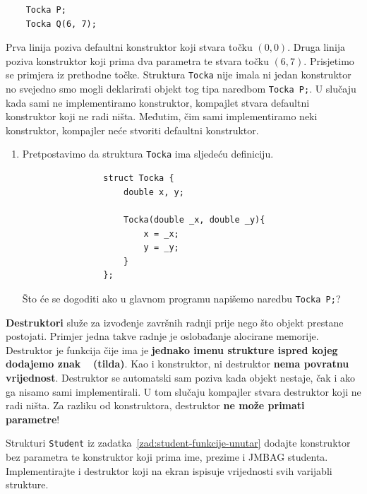 \begin{verbatim}
    Tocka P;
    Tocka Q(6, 7);
\end{verbatim}

Prva linija poziva defaultni konstruktor koji stvara točku $(0,0)$. Druga linija poziva konstruktor koji prima dva parametra te stvara točku $(6, 7)$.
Prisjetimo se primjera iz prethodne točke. Struktura \texttt{Tocka} nije imala ni jedan konstruktor no svejedno smo mogli deklarirati objekt tog tipa naredbom \texttt{Tocka P;}. U slučaju kada sami ne implementiramo konstruktor, kompajlet stvara defaultni konstruktor koji ne radi ništa. 
Međutim, čim sami implementiramo neki konstruktor, kompajler neće stvoriti defaultni konstruktor.

\begin{razmisljanje}
    \begin{enumerate}
        \item Pretpostavimo da struktura \texttt{Tocka} ima sljedeću definiciju.
            \begin{verbatim}
                struct Tocka {
                    double x, y;

                    Tocka(double _x, double _y){
                        x = _x;
                        y = _y;
                    }
                };
            \end{verbatim}
            Što će se dogoditi ako u glavnom programu napišemo naredbu \texttt{Tocka P;}?
    \end{enumerate}
\end{razmisljanje}


\medskip

\textbf{Destruktori} služe za izvođenje završnih radnji prije nego što objekt prestane postojati. Primjer jedna takve radnje je oslobađanje alocirane memorije. Destruktor je funkcija čije ima je \textbf{jednako imenu strukture ispred kojeg dodajemo znak \texttt{~} (tilda)}. 
Kao i konstruktor, ni destruktor \textbf{nema povratnu vrijednost}. Destruktor se automatski sam poziva kada objekt nestaje, čak i ako ga nisamo sami implementirali. U tom slučaju kompajler stvara destruktor koji ne radi ništa. Za razliku od konstruktora, destruktor \textbf{ne može primati parametre}!

\begin{zadatak}\label{zad:student-konstruktor}
    Strukturi \texttt{Student} iz zadatka~\ref{zad:student-funkcije-unutar} dodajte konstruktor bez parametra te konstruktor koji prima ime, prezime i JMBAG studenta. 
    Implementirajte i destruktor koji na ekran ispisuje vrijednosti svih varijabli strukture.
\end{zadatak}

